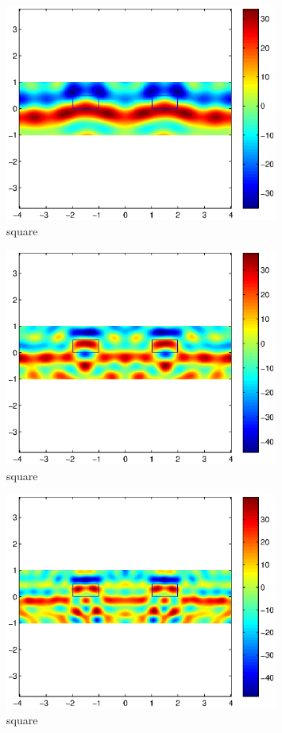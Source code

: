 \documentclass[12pt]{iopart}
\begin{document}
\begin{figure}
	\centering
	\includegraphics[width=0.8\textwidth]{./figure_rough/Bisq_1}
	\caption{square}\label{I1}
\end{figure}
\begin{figure}
	\centering
	\includegraphics[width=0.8\textwidth]{./figure_rough/Bisq_1point5}
	\caption{square}\label{I1}
\end{figure}
\begin{figure}
	\centering
	\includegraphics[width=0.8\textwidth]{./figure_rough/Bisq_2}
	\caption{square}\label{I1}
\end{figure}
\end{document}
